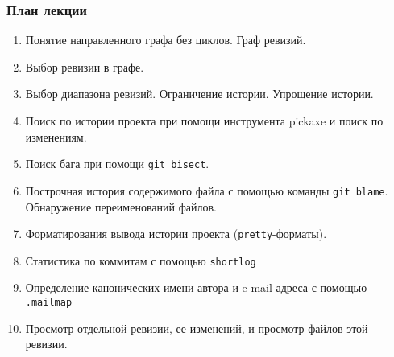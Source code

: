 \begin{frame}
	\frametitle{План лекции}
	
	\begin{enumerate}
		\item Понятие направленного графа без циклов. Граф ревизий.
		\item Выбор ревизии в графе.
		\item Выбор диапазона ревизий. Ограничение истории. Упрощение истории.
		\item Поиск по истории проекта при помощи инструмента pickaxe и поиск по изменениям.
		\item Поиск бага при помощи \texttt{git bisect}.
		\item Построчная история содержимого файла с помощью команды \texttt{git blame}.
			Обнаружение переименований файлов.
		\item Форматирования вывода истории проекта (\texttt{pretty}-форматы).
		\item Статистика по коммитам с помощью \texttt{shortlog}
		\item Определение канонических имени автора и e-mail-адреса с помощью \texttt{.mailmap}
		\item Просмотр отдельной ревизии, ее изменений, и просмотр файлов этой ревизии.
	\end{enumerate}
\end{frame}